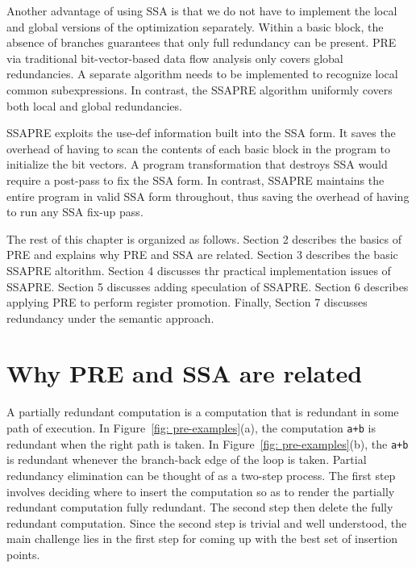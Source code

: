 Another advantage of using SSA is that we do not have to implement the local
and global versions of the optimization separately.  Within a basic block,
the absence of branches guarantees that only full redundancy can be present.
PRE via traditional bit-vector-based data flow analysis only covers global
redundancies.  A separate algorithm needs to be implemented to recognize
local common subexpressions.  In contrast, the SSAPRE algorithm uniformly
covers both local and global redundancies.

SSAPRE exploits the use-def information built into the SSA form.  It saves
the overhead of having to scan the contents of each basic block in the
program to initialize the bit vectors.  A program transformation that
destroys SSA would require a post-pass to fix the SSA form.  In contrast,
SSAPRE maintains the entire program in valid SSA form throughout,
thus saving the overhead of having to run any SSA fix-up pass.

The rest of this chapter is organized as follows.  Section 2 describes
the basics of PRE and explains why PRE and SSA are related.
Section 3 describes the basic SSAPRE altorithm.
Section 4 discusses thr practical implementation issues of SSAPRE.
Section 5 discusses adding speculation of SSAPRE.
Section 6 describes applying PRE to perform register promotion.
Finally, Section 7 discusses redundancy under the semantic approach.

\section{Why PRE and SSA are related}
\label{section:Part3:Pre_not_helped:PRErelatedtoSSA}

A partially redundant computation is a computation that is redundant in
some path of execution.  In Figure~\ref{fig: pre-examples}(a), the
computation {\tt a+b} is redundant when the right path is taken.
In Figure~\ref{fig: pre-examples}(b), the {\tt a+b} is redundant whenever
the branch-back edge of the loop is taken.
Partial redundancy elimination can be thought of as a two-step process.
The first step involves deciding where to insert the computation so as to
render the partially redundant computation fully redundant.  The second
step then delete the fully redundant computation.  Since the second step is
trivial and well understood, the main challenge lies in the first step
for coming up with the best set of insertion points.

